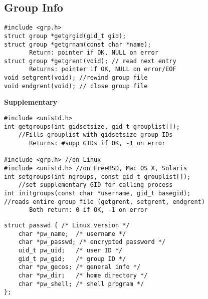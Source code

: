 \documentclass[10pt]{article}
\begin{document}
\begin{multicols}{2}
\begin{minipage}{\columnwidth}
        \subsection*{Group Info}
        \begin{lstlisting}
#include <grp.h>
struct group *getgrgid(gid_t gid);
struct group *getgrnam(const char *name);
       Return: pointer if OK, NULL on error
struct group *getgrent(void); // read next entry
       Returns: pointer if OK, NULL on error/EOF
void setgrent(void); //rewind group file
void endgrent(void); // close group file
        \end{lstlisting}
        \textbf{Supplementary}
        \begin{lstlisting}
#include <unistd.h>
int getgroups(int gidsetsize, gid_t grouplist[]);
    //Fills grouplist with gidsetsize group IDs
       Returns: #supp GIDs if OK, -1 on error

#include <grp.h> //on Linux
#include <unistd.h> //on FreeBSD, Mac OS X, Solaris
int setgroups(int ngroups, const gid_t grouplist[]);
    //set supplementary GID for calling process
int initgroups(const char *username, gid_t basegid);
//reads entire group file (getgrent, setgrent, endgrent)
       Both return: 0 if OK, -1 on error 
        \end{lstlisting}
        \begin{lstlisting}
struct passwd { /* Linux version */
    char *pw_name;  /* username */
    char *pw_passwd; /* encrypted password */
    uid_t pw_uid;   /* user ID */
    gid_t pw_gid;   /* group ID */
    char *pw_gecos; /* general info */
    char *pw_dir;   /* home directory */
    char *pw_shell; /* shell program */
};
        \end{lstlisting}
        \vspace*{-2em}

\end{minipage}
\end{multicols}
\end{document}
